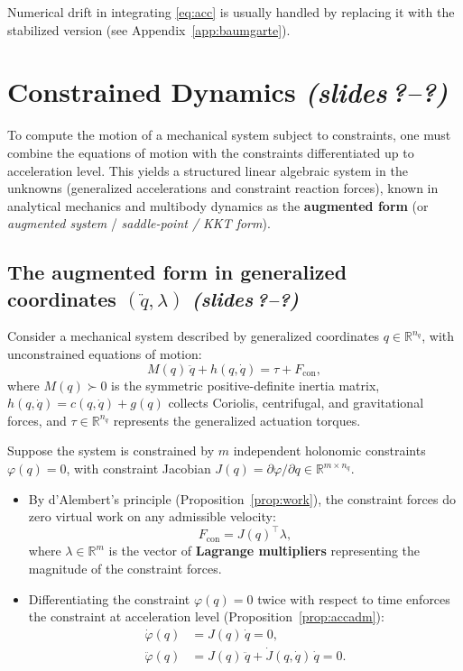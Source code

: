 \documentclass[11pt,a4paper]{article}
\newcommand{\R}{\mathbb{R}}
\newcommand{\sr}{\emph{(slides\,?--?)}}
\begin{document}
Numerical drift in integrating \eqref{eq:acc} is usually handled by replacing it with the
stabilized version (see Appendix~\ref{app:baumgarte}).

\section{Constrained Dynamics \sr}\label{sec:cdyn}

To compute the motion of a mechanical system subject to constraints, one must combine the equations of motion with the constraints differentiated up to acceleration level. This yields a structured linear algebraic system in the unknowns (generalized accelerations and constraint reaction forces), known in analytical mechanics and multibody dynamics as the \textbf{augmented form} (or \emph{augmented system} / \emph{saddle-point / KKT form}).

\subsection{The augmented form in generalized coordinates $(\ddot q, \lambda)$ \sr}

Consider a mechanical system described by generalized coordinates $q \in \R^{n_q}$, with unconstrained equations of motion:
\begin{equation}\label{eq:eom_unconstrained}
  M(q)\,\ddot q + h(q,\dot q) = \tau + F_{\mathrm{con}},
\end{equation}
where $M(q) \succ 0$ is the symmetric positive-definite inertia matrix, $h(q,\dot q) = c(q,\dot q) + g(q)$ collects Coriolis, centrifugal, and gravitational forces, and $\tau \in \R^{n_q}$ represents the generalized actuation torques.

Suppose the system is constrained by $m$ independent holonomic constraints $\varphi(q) = 0$, with constraint Jacobian $J(q) = \partial\varphi/\partial q \in \R^{m \times n_q}$.
\begin{itemize}[nosep]
  \item By d'Alembert's principle (Proposition~\ref{prop:work}), the constraint forces do zero virtual work on any admissible velocity:
  \begin{equation}
    F_{\mathrm{con}} = J(q)^\top \lambda,
  \end{equation}
  where $\lambda \in \R^m$ is the vector of \textbf{Lagrange multipliers} representing the magnitude of the constraint forces.
  \item Differentiating the constraint $\varphi(q) = 0$ twice with respect to time enforces the constraint at acceleration level (Proposition~\ref{prop:accadm}):
  \begin{align}
    \dot\varphi(q) &= J(q)\,\dot q = 0, \label{eq:velo_holo}\\
    \ddot\varphi(q) &= J(q)\,\ddot q + \dot J(q,\dot q)\,\dot q = 0. \label{eq:acc_holo}
  \end{align}
\end{itemize}
\end{document}
